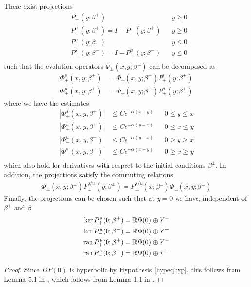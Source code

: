 \documentclass[thesis.tex]{subfiles}
\begin{document}
\begin{lemma}\label{dichotomy1}
There exist projections
\begin{align*}
&P_+^s(y; \beta^+) && y \geq 0 \\
&P_+^u(y; \beta^+) = I - P_+^s(y; \beta^+) && y \geq 0 \\
&P_-^u(y; \beta^-) && y \leq 0 \\
&P_-^s(y; \beta^-) = I - P_-^u(y; \beta^-) && y \leq 0 \\
\end{align*}
such that the evolution operators $\Phi_\pm(x, y; \beta^\pm)$ can be decomposed as
\begin{align*}
\Phi^s_\pm(x, y; \beta^\pm) &= \Phi_\pm(x, y; \beta^\pm) P^s_\pm(y; \beta^\pm) \\
\Phi^u_\pm(x, y; \beta^\pm) &= \Phi_\pm(x, y; \beta^\pm) P^u_\pm(y; \beta^\pm) 
\end{align*}
where we have the estimates
\begin{align*}
|\Phi^s_+(x, y, \beta^+)| &\leq C e^{-\alpha(x - y)} && 0 \leq y \leq x \\
|\Phi^u_+(x, y, \beta^+)| &\leq C e^{-\alpha(y - x)} && 0 \leq x \leq y \\
|\Phi^u_-(x, y, \beta^-)| &\leq C e^{-\alpha(y - x)} && 0 \geq y \geq x \\
|\Phi^s_-(x, y, \beta^-)| &\leq C e^{-\alpha(x - y)} && 0 \geq x \geq y \\
\end{align*}
which also hold for derivatives with respect to the initial conditions $\beta^\pm$. In addition, the projections satisfy the commuting relations
\begin{align*}
\Phi_\pm(x, y; \beta^\pm) P^{s/u}_\pm(y; \beta^\pm) 
= P^{s/u}_\pm(x; \beta^\pm) \Phi_\pm(x, y; \beta^\pm)
\end{align*}
Finally, the projections can be chosen such that at $y = 0$ we have, independent of $\beta^+$ and $\beta^-$
\begin{align*}
\mathop\mathrm{ker}\nolimits P^s_+(0; \beta^+) &= \mathbb{R} \Psi(0) \oplus Y^- \\
\mathop\mathrm{ker}\nolimits P^u_-(0; \beta^-) &= \mathbb{R} \Psi(0) \oplus Y^+ \\
\operatorname{ran} P^u_+(0; \beta^+) &= \mathbb{R} \Psi(0) \oplus Y^- \\
\operatorname{ran} P^s_-(0; \beta^-) &= \mathbb{R} \Psi(0) \oplus Y^+
\end{align*}

\begin{proof}
Since $DF(0)$ is hyperbolic by Hypothesis \ref{hypeqhyp}, this follows from Lemma 5.1 in \cite{Sandstede1997}, which follows from Lemma 1.1 in \cite{Sandstede1993}.
\end{proof}
\end{lemma}
\end{document}
